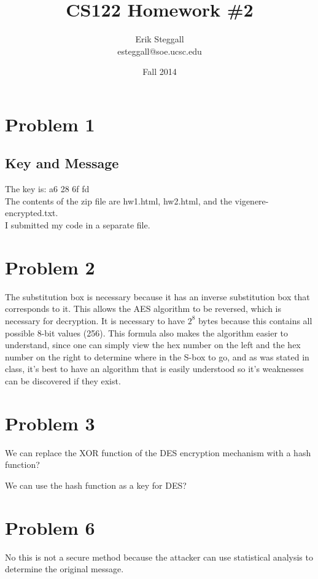 \documentclass{article}
\title{CS122 Homework \#2}
\author{Erik Steggall \\ esteggall@soe.ucsc.edu}
\date{Fall 2014}
\begin{document}
 \maketitle \pagestyle{empty}
\section*{Problem 1}
\subsection*{Key and Message}
The key is: a6 28 6f fd\\
The contents of the zip file are hw1.html, hw2.html, and the vigenere-encrypted.txt.\\
I submitted my code in a separate file.\\
\section*{Problem 2}
The substitution box is necessary because it has an inverse substitution box that corresponds to it. This allows the AES algorithm to be reversed, which is necessary for decryption. It is necessary to have $2^8$ bytes because this contains all possible 8-bit values (256). This formula also makes the algorithm easier to understand, since one can simply view the hex number on the left and the hex number on the right to determine where in the S-box to go, and as was stated in class, it's best to have an algorithm that is easily understood so it's weaknesses can be discovered if they exist.\\

\section*{Problem 3}
We can replace the XOR function of the DES encryption mechanism with a hash function? 

We can use the hash function as a key for DES?


\section*{Problem 6}
No this is not a secure method because the attacker can use statistical analysis to determine the original message.\\
\end{document}
